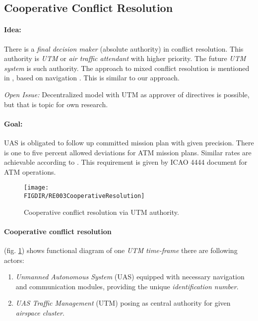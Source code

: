 \subsection{Cooperative Conflict Resolution}\label{sec:cooperativeConflictResolution}


\paragraph{Idea:} There is a \emph{final decision maker} (absolute authority) in conflict resolution. This authority is \emph{UTM} or \emph{air traffic attendant} with higher priority. The future \emph{UTM system} is such authority. The approach to mixed conflict resolution is mentioned in \cite{ramasamy2014towards}, based on navigation \cite{ramasamy2013novel}. This is similar to our approach. 

\begin{note}
    \emph{Open Issue:} Decentralized model with UTM as approver of directives is possible, but that is topic for own research.
\end{note}

\paragraph{Goal:} UAS is obligated to follow up committed mission plan with given precision.  There is one to five percent  allowed deviations for ATM mission plans.     Similar rates are achievable according to \cite{ramasamy2014towards}.  This requirement is given by \cite{icao4444} ICAO 4444 document for ATM operations.

\begin{figure}[H]
    \centering
    \texttt{[image: \\FIGDIR/RE003CooperativeResolution]} 
    \caption{Cooperative conflict resolution via UTM authority.}
    \label{fig:CooperativeConflictResolutionUTM}
\end{figure}

\paragraph{Cooperative conflict resolution} (fig. \ref{fig:CooperativeConflictResolutionUTM}) shows functional diagram of one \emph{UTM time-frame} there  are following actors:
\begin{enumerate}
    \item \emph{Unmanned Autonomous System} (UAS) equipped with necessary navigation and communication modules, providing the unique \emph{identification number}.
    
    \item \emph{UAS Traffic Management} (UTM) posing as central authority for given \emph{airspace cluster}.
\end{enumerate}

